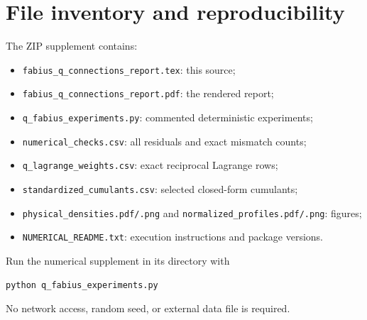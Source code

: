 \documentclass[11pt,oneside]{article}
\theoremstyle{definition}
\theoremstyle{remark}
\begin{document}
\section{File inventory and reproducibility}
The ZIP supplement contains:
\begin{itemize}
\item \texttt{fabius\_q\_connections\_report.tex}: this source;
\item \texttt{fabius\_q\_connections\_report.pdf}: the rendered report;
\item \texttt{q\_fabius\_experiments.py}: commented deterministic experiments;
\item \texttt{numerical\_checks.csv}: all residuals and exact mismatch counts;
\item \texttt{q\_lagrange\_weights.csv}: exact reciprocal Lagrange rows;
\item \texttt{standardized\_cumulants.csv}: selected closed-form cumulants;
\item \texttt{physical\_densities.pdf/.png} and
  \texttt{normalized\_profiles.pdf/.png}: figures;
\item \texttt{NUMERICAL\_README.txt}: execution instructions and package
  versions.
\end{itemize}
Run the numerical supplement in its directory with
\begin{verbatim}
python q_fabius_experiments.py
\end{verbatim}
No network access, random seed, or external data file is required.
\end{document}
